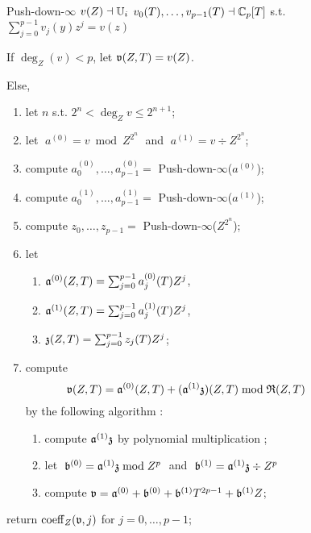 \begin{figure}
  \begin{algorithm}
    {Push-down-$\infty$}
    {$v(Z)\dashv\mathbb{U}_i$}
    {$v_0(T),\ldots,v_{p-1}(T)\dashv\mathbb{C}_p[T]$ s.t. $\sum_{j=0}^{p-1}v_j(y)
      z^j = v(z)$}
  \item If $\deg_Z(v) < p$, let $\mathfrak{v}(Z,T) = v(Z)$.
  \item Else,
    \begin{enumerate}
    \item let $n$ s.t. $2^n < \deg_Z v \le 2^{n+1}$;
    \item let $\;a^{(0)} = v \bmod Z^{2^n}\;$ and $\;a^{(1)} = v \div Z^{2^n}$;
    \item \label{alg:push-down:rec1} compute
      $a^{(0)}_0,\ldots,a^{(0)}_{p-1} = $
      Push-down-$\infty$($a^{(0)}$);
    \item \label{alg:push-down:rec2} compute
      $a^{(1)}_0,\ldots,a^{(1)}_{p-1} = $
      Push-down-$\infty$($a^{(1)}$);
    \item \label{alg:push-down:rec3} compute $z_0,\ldots,z_{p-1} = $
    Push-down-$\infty$($Z^{2^n}$);
    \item let
      \begin{enumerate}
      \item $\mathfrak{a}^{(0)}(Z,T) = \sum_{j=0}^{p-1}a^{(0)}_j(T)Z^j$,
      \item $\mathfrak{a}^{(1)}(Z,T) = \sum_{j=0}^{p-1}a^{(1)}_j(T)Z^j$,
      \item $\mathfrak{z}(Z,T) = \sum_{j=0}^{p-1}z_j(T)Z^j$;
      \end{enumerate}
    \item \label{alg:push-down:bivv} compute \[\mathfrak{v}(Z,T) =
      \mathfrak{a}^{(0)}(Z,T) + (\mathfrak{a}^{(1)}\mathfrak{z})(Z,T) \bmod
      \mathfrak{R}(Z,T)\] by the following algorithm :
      \begin{enumerate}
      \item \label{alg:push-down:prod} compute $\mathfrak{a}^{(1)}\mathfrak{z}$
      by polynomial multiplication ;
      \item let $\;\mathfrak{b}^{(0)} = \mathfrak{a}^{(1)}\mathfrak{z} \bmod Z^p\;$ and
	$\;\mathfrak{b}^{(1)} = \mathfrak{a}^{(1)}\mathfrak{z} \div Z^p$
      \item \label{alg:push-down:sum} compute $\mathfrak{v} =
	\mathfrak{a}^{(0)} + \mathfrak{b}^{(0)} + \mathfrak{b}^{(1)}T^{2p-1} +
	\mathfrak{b}^{(1)}Z$;
      \end{enumerate}
    \end{enumerate}
  \item return $\operatorname{coeff}_Z(\mathfrak{v},j)$ for $j=0,\ldots,p-1$;
  \end{algorithm}
\end{figure}


